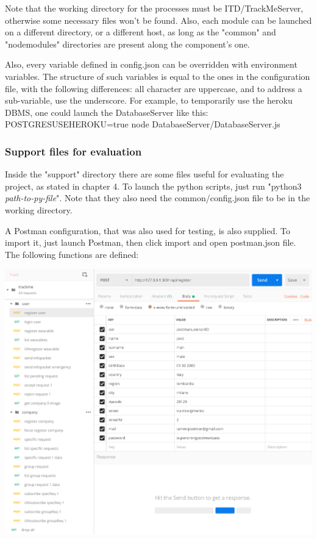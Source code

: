 \documentclass[../main.tex]{subfiles}
\begin{document}
Note that the working directory for the processes must be ITD/TrackMeServer, otherwise some necessary files won't be found. Also, each module can be launched on a different directory, or a different host, as long as the "common" and "node\textunderscore modules" directories are present along the component's one.

Also, every variable defined in config.json can be overridden with environment variables. The structure of such variables is equal to the ones in the configuration file, with the following differences: all character are uppercase, and to address a sub-variable, use the underscore. For example, to temporarily use the heroku DBMS, one could launch the DatabaseServer like this:\newline
POSTGRES\textunderscore USEHEROKU=true node DatabaseServer/DatabaseServer.js

\subsubsection{Support files for evaluation}

Inside the "support" directory there are some files useful for evaluating the project, as stated in chapter 4. To launch the python scripts, just run "python3 \textit{path-to-py-file}". Note that they also need the common/config.json file to be in the working directory.

A Postman configuration, that was also used for testing, is also supplied. To import it, just launch Postman, then click import and open postman.json file. The following functions are defined: \newline

\includegraphics[width = \linewidth ]{images/postman_screen.png}
\end{document}
